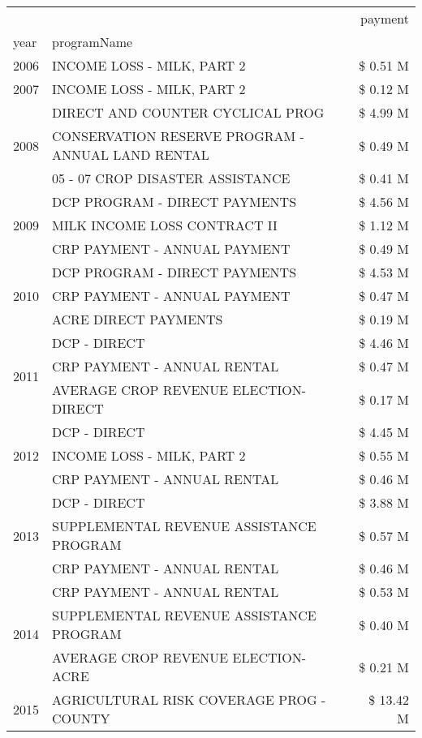\begin{tabular}{llr}
\toprule
 &  & payment \\
year & programName &  \\
\midrule
2006 & INCOME LOSS - MILK, PART 2 & \$ 0.51 M \\
\cline{1-3}
2007 & INCOME LOSS - MILK, PART 2 & \$ 0.12 M \\
\cline{1-3}
\multirow[t]{3}{*}{2008} & DIRECT AND COUNTER CYCLICAL PROG & \$ 4.99 M \\
 & CONSERVATION RESERVE PROGRAM - ANNUAL LAND RENTAL & \$ 0.49 M \\
 & 05 - 07 CROP DISASTER ASSISTANCE & \$ 0.41 M \\
\cline{1-3}
\multirow[t]{3}{*}{2009} & DCP PROGRAM - DIRECT PAYMENTS & \$ 4.56 M \\
 & MILK INCOME LOSS CONTRACT II & \$ 1.12 M \\
 & CRP PAYMENT - ANNUAL PAYMENT & \$ 0.49 M \\
\cline{1-3}
\multirow[t]{3}{*}{2010} & DCP PROGRAM - DIRECT PAYMENTS & \$ 4.53 M \\
 & CRP PAYMENT - ANNUAL PAYMENT & \$ 0.47 M \\
 & ACRE DIRECT PAYMENTS & \$ 0.19 M \\
\cline{1-3}
\multirow[t]{3}{*}{2011} & DCP - DIRECT & \$ 4.46 M \\
 & CRP PAYMENT - ANNUAL RENTAL & \$ 0.47 M \\
 & AVERAGE CROP REVENUE ELECTION-DIRECT & \$ 0.17 M \\
\cline{1-3}
\multirow[t]{3}{*}{2012} & DCP - DIRECT & \$ 4.45 M \\
 & INCOME LOSS - MILK, PART 2 & \$ 0.55 M \\
 & CRP PAYMENT - ANNUAL RENTAL & \$ 0.46 M \\
\cline{1-3}
\multirow[t]{3}{*}{2013} & DCP - DIRECT & \$ 3.88 M \\
 & SUPPLEMENTAL REVENUE ASSISTANCE PROGRAM & \$ 0.57 M \\
 & CRP PAYMENT - ANNUAL RENTAL & \$ 0.46 M \\
\cline{1-3}
\multirow[t]{3}{*}{2014} & CRP PAYMENT - ANNUAL RENTAL & \$ 0.53 M \\
 & SUPPLEMENTAL REVENUE ASSISTANCE PROGRAM & \$ 0.40 M \\
 & AVERAGE CROP REVENUE ELECTION-ACRE & \$ 0.21 M \\
\cline{1-3}
\multirow[t]{3}{*}{2015} & AGRICULTURAL RISK COVERAGE PROG - COUNTY & \$ 13.42 M \\

\end{tabular}
